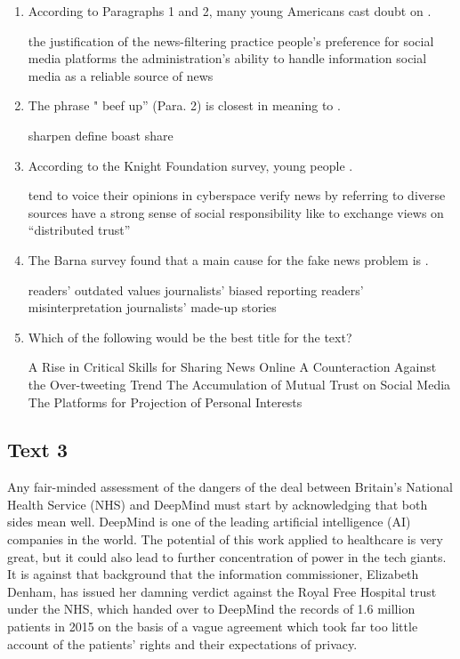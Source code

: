 \begin{enumerate}[resume]
	\item
According to Paragraphs 1 and 2, many young Americans cast doubt on \lineread.


\fourchoices
{the justification of the news-filtering practice}
{people's preference for social media platforms}
{the administration's ability to handle information}
{social media as a reliable source of news}


\item
The phrase " beef up'' (Para. 2) is closest in meaning to \lineread.


\fourchoices
{sharpen}
{define}
{boast}
{share}



\item
According to the Knight Foundation survey, young people \lineread.


\fourchoices
{tend to voice their opinions in cyberspace}
{verify news by referring to diverse sources}
{have a strong sense of social responsibility}
{like to exchange views on ``distributed trust''}


\item
The Barna survey found that a main cause for the fake news problem
is \lineread.


\fourchoices
{readers' outdated values}
{journalists' biased reporting}
{readers' misinterpretation}
{journalists' made-up stories}


\item
Which of the following would be the best title for the text?


\fourchoices
{A Rise in Critical Skills for Sharing News Online}
{A Counteraction Against the Over-tweeting Trend}
{The Accumulation of Mutual Trust on Social Media}
{The Platforms for Projection of Personal Interests}


\end{enumerate}


\newpage
\subsection{Text 3}


Any fair-minded assessment of the dangers of the deal between Britain's
National Health Service (NHS) and DeepMind must start by acknowledging
that both sides mean well. DeepMind is one of the leading artificial
intelligence (AI) companies in the world. The potential of this work
applied to healthcare is very great, but it could also lead to further
concentration of power in the tech giants. It is against that
background that the information commissioner, Elizabeth Denham, has
issued her damning verdict against the Royal Free Hospital trust under
the NHS, which handed over to DeepMind the records of 1.6 million
patients in 2015 on the basis of a vague agreement which took far too
little account of the patients' rights and their expectations of
privacy.

